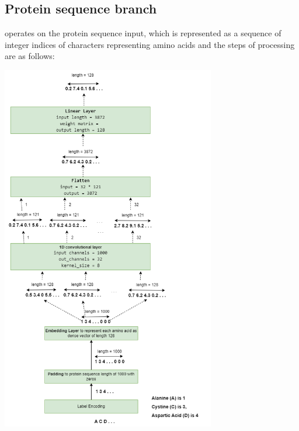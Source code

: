 \documentclass[11pt, a4paper]{article}
\begin{document}
    \subsection{Protein sequence branch}
    operates on the protein sequence input, which is represented as a sequence of integer indices of characters representing amino acids and the steps of processing are as follows:
        \begin{center}
            \includegraphics[width=0.7\textwidth]{model/Protein branch.drawio.png}
        \end{center}
\end{document}
